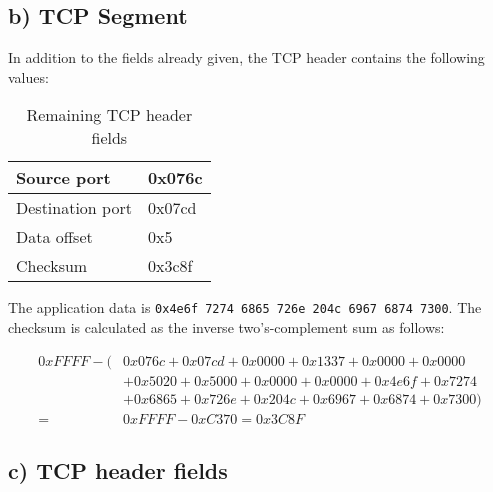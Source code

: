 \documentclass[a4paper, 11 pt, article, accentcolor=tud7b]{tudreport}
\begin{document}
	\subsection*{b) TCP Segment}
	
	In addition to the fields already given, the TCP header contains the following values:
	
	\begin{table}[h]
	  \centering
	  \begin{tabular}{|l|l|}
	    \hline
	    Source port & 0x076c \\ \hline
	    Destination port & 0x07cd \\ \hline
	    Data offset & 0x5 \\ \hline
	    Checksum & 0x3c8f \\ \hline
	  \end{tabular}
	  \caption{Remaining TCP header fields}
	\end{table}
	
	The application data is \verb|0x4e6f 7274 6865 726e 204c 6967 6874 7300|. The checksum is calculated as the inverse two's-complement sum as follows: 
	
	\begin{align*}
	  0xFFFF - (&0x076c + 0x07cd + 0x0000 + 0x1337 + 0x0000 + 0x0000 \\
	            &+ 0x5020 + 0x5000 + 0x0000 + 0x0000 + 0x4e6f + 0x7274 \\
	            &+ 0x6865 + 0x726e + 0x204c + 0x6967 + 0x6874 + 0x7300) \\
	          = &0xFFFF - 0xC370 = 0x3C8F
	\end{align*}
	
	\subsection*{c) TCP header fields}
	
	\FloatBarrier
	
\end{document}
